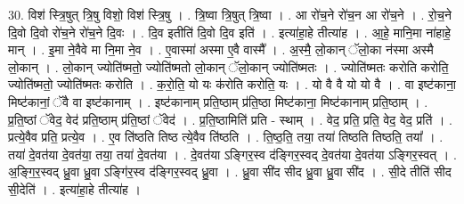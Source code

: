 \documentclass[17pt]{extarticle}
\begin{document}
30. विश॑ स्त्रि॒षुत् त्रि॒षु विशो॒ विश॑ स्त्रि॒षु । . त्रि॒ष्वा त्रि॒षुत् त्रि॒ष्वा । . आ रो॑च॒ने रो॑च॒न आ रो॑च॒ने । . रो॒च॒ने दि॒वो दि॒वो रो॑च॒ने रो॑च॒ने दि॒वः । . दि॒व इतीति॑ दि॒वो दि॒व इति॑ । . इत्या॑हा॒हे तीत्या॑ह । . आ॒हे॒ मानि॒मा ना॑हाहे॒ मान् । . इ॒मा ने॒वैवे मा नि॒मा ने॒व । . ए॒वास्मा॑ अस्मा ए॒वै वास्मै᳚ । . अ॒स्मै॒ लो॒कान् ॅलो॒का न॑स्मा अस्मै लो॒कान् । . लो॒कान् ज्योति॑ष्मतो॒ ज्योति॑ष्मतो लो॒कान् ॅलो॒कान् ज्योति॑ष्मतः । . ज्योति॑ष्मतः करोति करोति॒ ज्योति॑ष्मतो॒ ज्योति॑ष्मतः करोति । . क॒रो॒ति॒ यो यः क॑रोति करोति॒ यः । . यो वै वै यो यो वै । . वा इष्ट॑काना॒ मिष्ट॑कानां॒ ॅवै वा इष्ट॑कानाम् । . इष्ट॑कानाम् प्रति॒ष्ठाम् प्र॑ति॒ष्ठा मिष्ट॑काना॒ मिष्ट॑कानाम् प्रति॒ष्ठाम् । . प्र॒ति॒ष्ठां ॅवेद॒ वेद॑ प्रति॒ष्ठाम् प्र॑ति॒ष्ठां ॅवेद॑ । . प्र॒ति॒ष्ठामिति॑ प्रति - स्थाम् । . वेद॒ प्रति॒ प्रति॒ वेद॒ वेद॒ प्रति॑ । . प्रत्ये॒वैव प्रति॒ प्रत्ये॒व । . ए॒व ति॑ष्ठति तिष्ठ त्ये॒वैव ति॑ष्ठति । . ति॒ष्ठ॒ति॒ तया॒ तया॑ तिष्ठति तिष्ठति॒ तया᳚ । . तया॑ दे॒वत॑या दे॒वत॑या॒ तया॒ तया॑ दे॒वत॑या । . दे॒वत॑या ऽङ्गिर॒स्व द॑ङ्गिर॒स्वद् दे॒वत॑या दे॒वत॑या ऽङ्गिर॒स्वत् । . अ॒ङ्गि॒र॒स्वद् ध्रु॒वा ध्रु॒वा ऽङ्गि॑र॒स्व द॑ङ्गिर॒स्वद् ध्रु॒वा । . ध्रु॒वा सी॑द सीद ध्रु॒वा ध्रु॒वा सी॑द । . सी॒दे तीति॑ सीद सी॒देति॑ । . इत्या॑हा॒हे तीत्या॑ह । \newline
\end{document}
